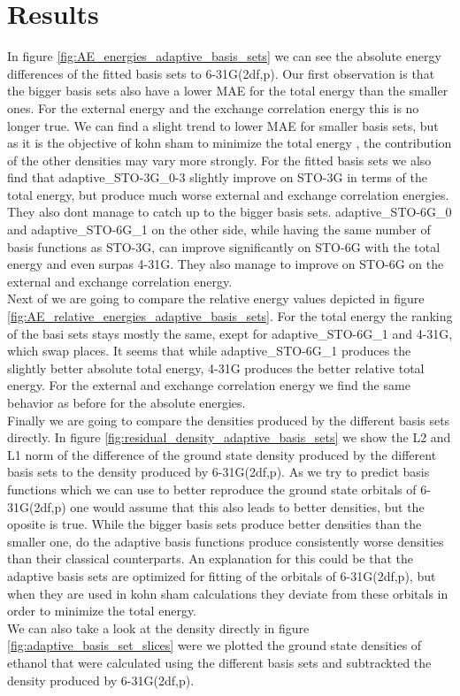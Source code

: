 \section{Results}
In figure \ref{fig:AE_energies_adaptive_basis_sets} we can see the absolute energy differences of the fitted basis sets to 6-31G(2df,p). Our first observation is that the bigger basis sets also have a lower MAE for the total energy than the smaller ones. For the external energy and the exchange correlation energy this is no longer true. We can find a slight trend to lower MAE for smaller basis sets, but as it is the objective of kohn sham to minimize the total energy , the contribution of the other densities may vary more strongly. For the fitted basis sets we also find that adaptive\_STO-3G\_0-3 slightly improve on STO-3G in terms of the total energy, but produce much worse external and exchange correlation energies. They also dont manage to catch up to the bigger basis sets.  adaptive\_STO-6G\_0 and adaptive\_STO-6G\_1 on the other side, while having the same number of basis functions as STO-3G, can improve significantly on STO-6G with the total energy and even surpas 4-31G. They also manage to improve on STO-6G on the external and exchange correlation energy.\\
Next of we are going to compare the relative energy values depicted in figure \ref{fig:AE_relative_energies_adaptive_basis_sets}. For the total energy the ranking of the basi sets stays mostly the same, exept for adaptive\_STO-6G\_1 and 4-31G, which swap places. It seems that while adaptive\_STO-6G\_1 produces the slightly better absolute total energy, 4-31G produces the better relative total energy. For the external and exchange correlation energy we find the same behavior as before for the absolute energies.\\
Finally we are going to compare the densities produced by the different basis sets directly. In figure \ref{fig:residual_density_adaptive_basis_sets} we show the L2 and L1 norm of the difference of the ground state density produced by the different basis sets to the density produced by 6-31G(2df,p). As we try to predict basis functions which we can use to better reproduce the ground state orbitals of 6-31G(2df,p) one would assume that this also leads to better densities, but the oposite is true. While the bigger basis sets produce better densities than the smaller one, do the adaptive basis functions produce consistently worse densities than their classical counterparts. An explanation for this could be that the adaptive basis sets are optimized for fitting of the orbitals of 6-31G(2df,p), but when they are used in kohn sham calculations they deviate from these orbitals in order to minimize the total energy.\\
We can also take a look at the density directly in figure \ref{fig:adaptive_basis_set_slices} were we plotted the ground state densities of ethanol that were calculated using the different basis sets and subtrackted the density produced by 6-31G(2df,p).






